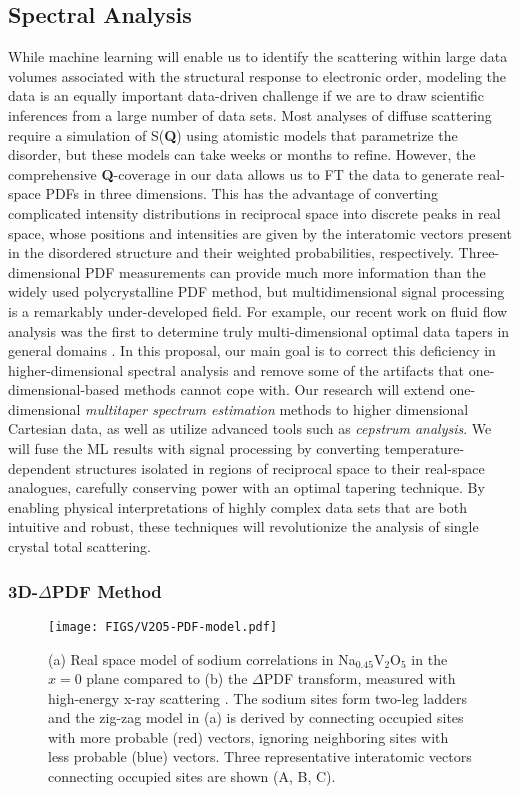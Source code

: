 \subsection{Spectral Analysis}
While machine learning will enable us to identify the scattering within large data
volumes associated with the structural response to electronic order, modeling the
data is an equally important data-driven challenge if we are to draw scientific
inferences from a large number of data sets. Most analyses of diffuse scattering
require a simulation of S(\textbf{Q}) using atomistic models that parametrize the
disorder, but these models can take weeks or months to refine. However, the
comprehensive \textbf{Q}-coverage in our data allows us to FT the data to generate
real-space PDFs in three dimensions. This has the advantage of converting complicated
intensity distributions in reciprocal space into discrete peaks in real space, whose
positions and intensities are given by the interatomic vectors present in the
disordered structure and their weighted probabilities, respectively.
Three-dimensional PDF measurements can provide much more information than the widely
used polycrystalline PDF method, but multidimensional signal processing is a
remarkably under-developed field. For example, our recent work on fluid flow analysis
was the first to determine truly multi-dimensional optimal data tapers in general
domains \cite{geoga2018}. In this proposal, our main goal is to correct this
deficiency in higher-dimensional spectral analysis and remove some of the artifacts
that one-dimensional-based methods cannot cope with. Our research will extend
one-dimensional \emph{multitaper spectrum estimation} methods to higher dimensional
Cartesian data, as well as utilize advanced tools such as \emph{cepstrum analysis}.
We will fuse the ML results with signal processing by converting
temperature-dependent structures isolated in regions of reciprocal space to their
real-space analogues, carefully conserving power with an optimal tapering technique.
By enabling physical interpretations of highly complex data sets that are both
intuitive and robust, these techniques will revolutionize the analysis of single
crystal total scattering. 

\subsubsection{3D-$\Delta$PDF Method}

\begin{figure}[!b]
\begin{center}
\texttt{[image: FIGS/V2O5-PDF-model.pdf]}
\caption{\label{fig:V2O5-PDF-model} (a) Real space model of sodium correlations in
Na$_{0.45}$V$_2$O$_5$ in the $x=0$ plane compared to (b) the $\Delta$PDF transform,
measured with high-energy x-ray scattering \cite{Krogstad:2019tc}. The sodium sites
form two-leg ladders and the zig-zag model in (a) is derived by connecting occupied
sites with more probable (red) vectors, ignoring neighboring sites with less probable
(blue) vectors. Three representative interatomic vectors connecting occupied sites
are shown (A, B, C).}
\end{center}
\end{figure}

